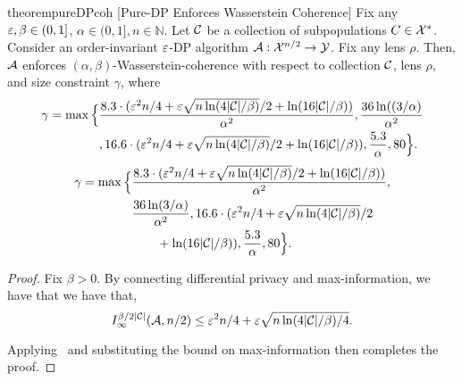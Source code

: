 \begin{restatable}{theorem}{pureDPcoh}
    [Pure-DP Enforces Wasserstein Coherence]\label{thm:pure-dp-implies-coherence-enforcement}
    Fix any $\varepsilon, \beta \in (0,1]$, $\alpha \in (0,1], n \in \mathbb{N}$.
     Let $\mathcal{C}$ be a collection of subpopulations $C \in \mathcal{X}^*$. Consider an order-invariant $\varepsilon$-DP algorithm ${\mathcal{A}:\mathcal{X}^{n/2}\to \mathcal{Y}}$. Fix any lens $\rho$. Then, $\mathcal{A}$ enforces $(\alpha,\beta)$-Wasserstein-coherence with respect to  collection $\mathcal{C}$, lens $\rho$, and size constraint $\gamma$, where
     \ifnum{}
     \begin{align}
        \gamma= \max\Big\{ & \frac{8.3 \cdot (\varepsilon^2n/4 + \varepsilon\sqrt{n\ln(4|\mathcal{C}|/\beta)}/2 + \ln(16|\mathcal{C}|/\beta))}{\alpha^2}, \frac{36\ln((3/\alpha)}{\alpha^2} \nonumber \\
        &, 16.6 \cdot (\varepsilon^2n/4 + \varepsilon\sqrt{n\ln(4|\mathcal{C}|/\beta)}/2 + \ln(16|\mathcal{C}|/\beta)), \frac{5.3}{\alpha}, 80\Big\}.
    \end{align}
    \else
   \begin{align}
        \gamma= \max\Big\{ & \frac{8.3 \cdot (\varepsilon^2n/4 + \varepsilon\sqrt{n\ln(4|\mathcal{C}|/\beta)}/2 + \ln(16|\mathcal{C}|/\beta))}{\alpha^2}, \nonumber \\ & \frac{36\ln(3/\alpha)}{\alpha^2}, 16.6 \cdot (\varepsilon^2n/4 + \varepsilon\sqrt{n\ln(4|\mathcal{C}|/\beta)}/2 \nonumber \\
        & \qquad + \ln(16|\mathcal{C}|/\beta)), \frac{5.3}{\alpha}, 80\Big\}.
    \end{align}
    \fi
    
    
    
\end{restatable}
\ifnum{}
\begin{proof}

    Fix $\beta > 0$. By  connecting differential privacy and max-information, we have that we have that,
    $$I^{\beta/2|\mathcal{C}|}_{\infty}(\mathcal{A},n/2) \leq \varepsilon^2n/4 + \varepsilon\sqrt{n\ln(4|\mathcal{C}|/\beta)/4}.$$

    Applying~ and substituting the bound on max-information then completes the proof.
\end{proof}
\fi

